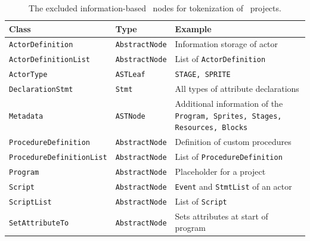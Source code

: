 \begin{table}[hbtp]
    \caption[The from tokenization excluded information-based \AST\ nodes]{\label{tab:excluded-metadata}The excluded information-based \AST\ nodes for tokenization of \scratch\ projects.}

    \begin{tabular}[t]{lll}
    	\toprule
    	Class & Type & Example \\
    	\midrule
    	\vspace{10pt}
    	    \texttt{ActorDefinition} & \texttt{AbstractNode} & Information storage of actor \\
    	    \vspace{10pt} 
    	    \texttt{ActorDefinitionList} & \texttt{AbstractNode} & List of \texttt{ActorDefinition} \\
    	    \vspace{10pt}
        \texttt{ActorType} & \texttt{ASTLeaf} & \texttt{STAGE, SPRITE} \\  
        \vspace{10pt}
        \texttt{DeclarationStmt} & \texttt{Stmt} & All types of attribute declarations\\
        \vspace{10pt}
        \texttt{Metadata} & \texttt{ASTNode} & \parbox[t]{7cm}{Additional information of the\\ \texttt{Program, Sprites, Stages, Resources, Blocks}} \\
        \vspace{10pt}
        \texttt{ProcedureDefinition} & \texttt{AbstractNode} & Definition of custom procedures \\
        \vspace{10pt}
        \texttt{ProcedureDefinitionList} & \texttt{AbstractNode} & List of \texttt{ProcedureDefinition} \\
        \vspace{10pt}
        \texttt{Program} & \texttt{AbstractNode} & Placeholder for a project\\
        \vspace{10pt}
        \texttt{Script} & \texttt{AbstractNode} & \texttt{Event} and \texttt{StmtList} of an actor \\  
        \vspace{10pt}
        \texttt{ScriptList} & \texttt{AbstractNode} & List of \texttt{Script} \\
        \vspace{10pt}
        \texttt{SetAttributeTo} & \texttt{AbstractNode} & Sets attributes at start of program \\

\end{tabular}
\end{table}
